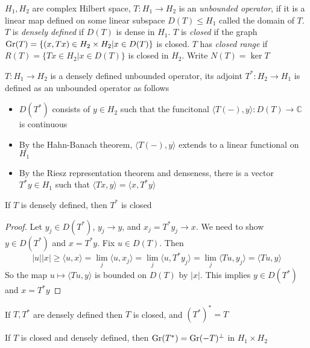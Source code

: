\documentclass[../main.tex]{subfiles}
\begin{document}
\begin{definition}
$H_1,H_2$ are complex Hilbert space, $T:H_1\to H_2$ is an \textit{unbounded operator}, if it is a linear map defined on some linear subspace $D(T)\leq H_1$ called the domain of $T$. $T$ is \textit{densely defined} if $D(T)$ is dense in $H_1$. $T$ is \textit{closed} if the graph $\operatorname{Gr}(T)=\{(x,Tx)\in H_2\times H_2|x\in D(T)\}$ is closed. $T$ has \textit{closed range} if $R(T)=\{Tx\in H_2|x\in D(T)\}$ is closed in $H_2$. Write $N(T)=\ker T$
\end{definition}

\begin{definition}
$T:H_1\to H_2$ is a densely defined unbounded operator, its adjoint $T^*:H_2\to H_1$ is defined as an unbounded operator as follows
\begin{itemize}
\item $D(T^*)$ consists of $y\in H_2$ such that the funcitonal $\langle T(-),y\rangle:D(T)\to\mathbb C$ is continuous
\item By the Hahn-Banach theorem, $\langle T(-),y\rangle$ extends to a linear functional on $H_1$
\item By the Riesz representation theorem and denseness, there is a vector $T^*y\in H_1$ such that $\langle Tx,y\rangle=\langle x,T^*y\rangle$
\end{itemize}
\end{definition}

\begin{proposition}
If $T$ is densely defined, then $T^*$ is closed
\end{proposition}

\begin{proof}
Let $y_j\in D(T^*)$, $y_j\to y$, and $x_j=T^*y_j\to x$. We need to show $y\in D(T^*)$ and $x=T^*y$. Fix $u\in D(T)$. Then
\[|u||x|\geq\langle u,x\rangle=\lim_j\langle u,x_j\rangle=\lim_j\langle u,T^*y_j\rangle=\lim_j\langle Tu,y_j\rangle=\langle Tu,y\rangle\]
So the map $u\mapsto\langle Tu,y\rangle$ is bounded on $D(T)$ by $|x|$. This implies $y\in D(T^*)$ and $x=T^*y$
\end{proof}

\begin{fact}
If $T,T^*$ are densely defined then $T$ is closed, and $(T^*)^*=T$
\end{fact}

\begin{lemma}\label{Gr(T*)=Gr(-T)^perp}
If $T$ is closed and densely defined, then $\operatorname{Gr}(T^*)=\operatorname{Gr}(-T)^\perp$ in $H_1\times H_2$
\end{lemma}
\end{document}
